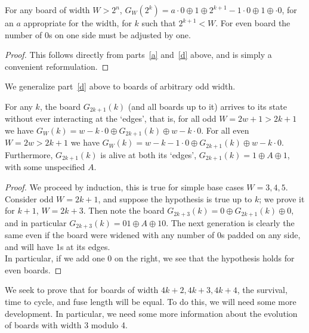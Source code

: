 \documentclass[12pt,letterpaper]{article}
\begin{document}
\begin{cor}\label{SingleWallPairPow2}
  For any board of width $W>2^n$, $G_W(2^k)=a\cdot 0\oplus 1\oplus 2^{k+1}-1\cdot 0\oplus 1\oplus \cdot 0$, for an $a$ appropriate for the width, for $k$ such that $2^{k+1}<W$. For even board the number of 0s on one side must be adjusted by one.
\end{cor}
\begin{proof}
  This follows directly from parts~\ref{a} and~\ref{d} above, and is simply a convenient reformulation.
\end{proof}

\noindent We generalize part~\ref{d} above to boards of arbitrary odd width.
\begin{prop}\label{OddBoardFirstEdge} %
  For any $k$, the board $G_{2k+1}(k)$ (and all boards up to it) arrives to its state without ever interacting at the `edges', that is, for all odd $W=2w+1>2k+1$ we have $G_W(k) = w-k \cdot 0 \oplus G_{2k+1}(k)\oplus w-k\cdot 0$. For all even $W=2w>2k+1$ we have $G_W(k) = w-k-1\cdot 0 \oplus G_{2k+1}(k)\oplus w-k\cdot 0$. \\
  Furthermore, $G_{2k+1}(k)$ is alive at both its `edges', $G_{2k+1}(k)=1\oplus A\oplus 1$, with some unspecified $A$.
\end{prop}
\begin{proof}
  
  We proceed by induction, this is true for simple base cases $W=3,4,5$. Consider odd $W=2k+1$, and suppose the hypothesis is true up to $k$; we prove it for $k+1$, $W=2k+3$. Then note the board $G_{2k+3}(k)=0\oplus G_{2k+1}(k)\oplus 0$, and in particular $G_{2k+3}(k)=01\oplus A\oplus 10$. The next generation is clearly the same even if the board were widened with any number of 0s padded on any side, and will have 1s at its edges. \\
  In particular, if we add one 0 on the right, we see that the hypothesis holds for even boards.
\end{proof}

We seek to prove that for boards of width $4k+2, 4k+3, 4k+4$, the survival, time to cycle, and fuse length will be equal. To do this, we will need some more development. In particular, we need some more information about the evolution of boards with width 3 modulo 4.
\end{document}
